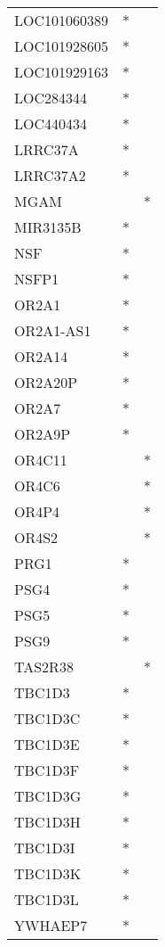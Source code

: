 \begin{longtable}{lcc}
LOC101060389 &              * &            \\
LOC101928605 &              * &            \\
LOC101929163 &              * &            \\
LOC284344    &              * &            \\
LOC440434    &              * &            \\
LRRC37A      &              * &            \\
LRRC37A2     &              * &            \\
MGAM         &                &          * \\
MIR3135B     &              * &            \\
NSF          &              * &            \\
NSFP1        &              * &            \\
OR2A1        &              * &            \\
OR2A1-AS1    &              * &            \\
OR2A14       &              * &            \\
OR2A20P      &              * &            \\
OR2A7        &              * &            \\
OR2A9P       &              * &            \\
OR4C11       &                &          * \\
OR4C6        &                &          * \\
OR4P4        &                &          * \\
OR4S2        &                &          * \\
PRG1         &              * &            \\
PSG4         &              * &            \\
PSG5         &              * &            \\
PSG9         &              * &            \\
TAS2R38      &                &          * \\
TBC1D3       &              * &            \\
TBC1D3C      &              * &            \\
TBC1D3E      &              * &            \\
TBC1D3F      &              * &            \\
TBC1D3G      &              * &            \\
TBC1D3H      &              * &            \\
TBC1D3I      &              * &            \\
TBC1D3K      &              * &            \\
TBC1D3L      &              * &            \\
YWHAEP7      &              * &            \\
\end{longtable}
